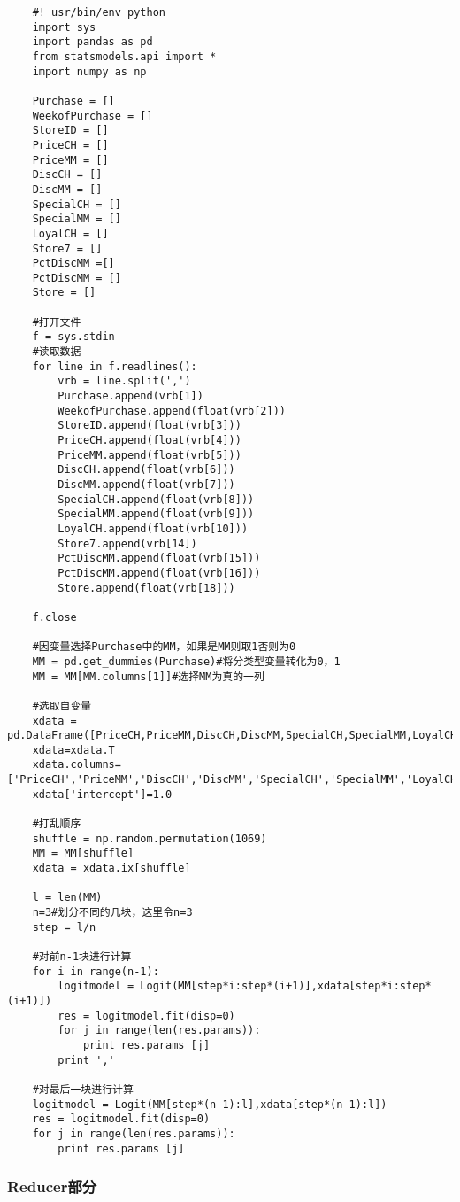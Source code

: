 \begin{lstlisting}
	#! usr/bin/env python
	import sys
	import pandas as pd
	from statsmodels.api import *
	import numpy as np

	Purchase = []
	WeekofPurchase = []
	StoreID = []
	PriceCH = []
	PriceMM = []
	DiscCH = []
	DiscMM = []
	SpecialCH = []
	SpecialMM = []
	LoyalCH = []
	Store7 = []
	PctDiscMM =[]
	PctDiscMM = []
	Store = []

	#打开文件
	f = sys.stdin
	#读取数据
	for line in f.readlines():
	    vrb = line.split(',')
	    Purchase.append(vrb[1])
	    WeekofPurchase.append(float(vrb[2]))
	    StoreID.append(float(vrb[3]))
	    PriceCH.append(float(vrb[4]))
	    PriceMM.append(float(vrb[5]))
	    DiscCH.append(float(vrb[6]))
	    DiscMM.append(float(vrb[7]))
	    SpecialCH.append(float(vrb[8]))
	    SpecialMM.append(float(vrb[9]))
	    LoyalCH.append(float(vrb[10]))
	    Store7.append(vrb[14])
	    PctDiscMM.append(float(vrb[15]))
	    PctDiscMM.append(float(vrb[16]))
	    Store.append(float(vrb[18]))

	f.close

	#因变量选择Purchase中的MM，如果是MM则取1否则为0
	MM = pd.get_dummies(Purchase)#将分类型变量转化为0，1
	MM = MM[MM.columns[1]]#选择MM为真的一列

	#选取自变量
	xdata = pd.DataFrame([PriceCH,PriceMM,DiscCH,DiscMM,SpecialCH,SpecialMM,LoyalCH])
	xdata=xdata.T
	xdata.columns=['PriceCH','PriceMM','DiscCH','DiscMM','SpecialCH','SpecialMM','LoyalCH']
	xdata['intercept']=1.0

	#打乱顺序
	shuffle = np.random.permutation(1069)
	MM = MM[shuffle]
	xdata = xdata.ix[shuffle]

	l = len(MM)
	n=3#划分不同的几块，这里令n=3
	step = l/n

	#对前n-1块进行计算
	for i in range(n-1):
	    logitmodel = Logit(MM[step*i:step*(i+1)],xdata[step*i:step*(i+1)])
	    res = logitmodel.fit(disp=0)
	    for j in range(len(res.params)):
	        print res.params [j]
	    print ','

	#对最后一块进行计算
	logitmodel = Logit(MM[step*(n-1):l],xdata[step*(n-1):l])
	res = logitmodel.fit(disp=0)
	for j in range(len(res.params)):
	    print res.params [j]
\end{lstlisting}

\subsubsection{Reducer部分}\label{reducerux90e8ux5206}

